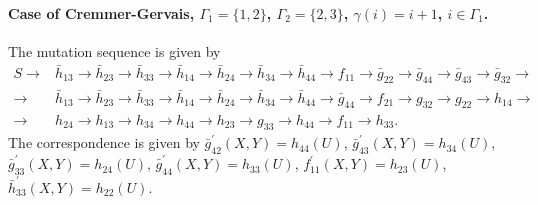 \paragraph{Case of Cremmer-Gervais, $\Gamma_1= \{1,2\}$, $\Gamma_2 = \{2,3\}$, $\gamma(i) = i+1$, $i \in \Gamma_1$.} The mutation sequence is given by
\begin{equation}\begin{split}
    S \rightarrow& \bar{h}_{13} \rightarrow \bar{h}_{23} \rightarrow \bar{h}_{33} \rightarrow \bar{h}_{14} \rightarrow \bar{h}_{24} \rightarrow \bar{h}_{34} \rightarrow \bar{h}_{44} \rightarrow f_{11}\rightarrow \bar{g}_{22}\rightarrow \bar{g}_{44} \rightarrow \bar{g}_{43} \rightarrow \bar{g}_{32} \rightarrow \\\rightarrow & \bar{h}_{13} \rightarrow \bar{h}_{23} \rightarrow \bar{h}_{33} \rightarrow \bar{h}_{14} \rightarrow \bar{h}_{24} \rightarrow \bar{h}_{34} \rightarrow \bar{h}_{44} \rightarrow \bar{g}_{44} \rightarrow f_{21} \rightarrow g_{32} \rightarrow g_{22} \rightarrow h_{14}\rightarrow\\\rightarrow& h_{24} \rightarrow h_{13}\rightarrow h_{34} \rightarrow h_{44} \rightarrow h_{23} \rightarrow g_{33}\rightarrow h_{44}\rightarrow f_{11}\rightarrow h_{33}.
    \end{split}
\end{equation}
The correspondence is given by $\bar{g}_{42}^{\prime}(X,Y) = h_{44}(U)$, $\bar{g}_{43}^{\prime}(X,Y) = h_{34}(U)$, $\bar{g}_{33}^{\prime}(X,Y) = h_{24}(U)$, $\bar{g}_{44}^{\prime}(X,Y) = h_{33}(U)$, $f_{11}^{\prime}(X,Y) = h_{23}(U)$, $\bar{h}_{33}^{\prime}(X,Y) = h_{22}(U)$.